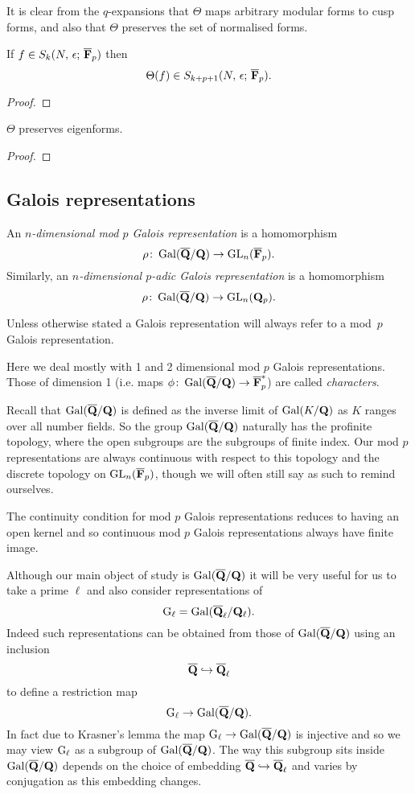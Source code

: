 \documentclass[a4paper,12pt]{article}
\begin{document}
It is clear from the $q$-expansions that $\Theta$ maps arbitrary modular forms to cusp forms, and also that $\Theta$ preserves the set of normalised forms.

\begin{prop}
If $f\in S_k(N,\,\epsilon;\,\overline{\mathbf{F}}_p)$ then
\[
\Theta(f)\in S_{k+p+1}(N,\,\epsilon;\,\overline{\mathbf{F}}_p).
\]
\end{prop}
\begin{proof}
\end{proof}

\begin{prop}
$\Theta$ preserves eigenforms.
\end{prop}
\begin{proof}
\end{proof}


\subsection{Galois representations}\label{sec:gals}
\begin{defn}
An \emph{$n$-dimensional mod $p$ Galois representation} is a homomorphism
\[
\rho\colon \operatorname{Gal}(\overline{\mathbf{Q}}/\mathbf{Q}) \to \operatorname{GL}_n(\overline{\mathbf{F}}_p).
\]
Similarly, an \emph{$n$-dimensional $p$-adic Galois representation} is a homomorphism
\[
\rho\colon \operatorname{Gal}(\overline{\mathbf{Q}}/\mathbf{Q}) \to \operatorname{GL}_n(\mathbf{Q}_p).
\]

Unless otherwise stated a Galois representation will always refer to a mod~$p$ Galois representation.
\end{defn}

Here we deal mostly with 1 and 2 dimensional mod $p$ Galois representations.
Those of dimension 1 (i.e. maps $\phi\colon\operatorname{Gal}(\overline{\mathbf{Q}}/\mathbf{Q}) \to \overline{\mathbf{F}}_p^*$) are called \emph{characters}.

Recall that $\operatorname{Gal}(\overline{\mathbf{Q}}/\mathbf{Q})$ is defined as the inverse limit of $\operatorname{Gal}(K/\mathbf{Q})$ as $K$ ranges over all number fields.
So the group $\operatorname{Gal}(\overline{\mathbf{Q}}/\mathbf{Q})$ naturally has the profinite topology, where the open subgroups are the subgroups of finite index.
Our mod $p$ representations are always continuous with respect to this topology and the discrete topology on $\operatorname{GL}_n(\overline{\mathbf{F}}_p)$, though we will often still say as such to remind ourselves.

\begin{rmk}\label{rmk:ctsfin}
The continuity condition for mod $p$ Galois representations reduces to having an open kernel and so continuous mod $p$ Galois representations always have finite image.
\end{rmk}

Although our main object of study is $\operatorname{Gal}(\overline{\mathbf{Q}}/\mathbf{Q})$ it will be very useful for us to take a prime $\ell$ and also consider representations of
\[
\mathrm{G}_\ell = \operatorname{Gal}(\overline{\mathbf{Q}}_\ell/\mathbf{Q}_\ell).
\]
Indeed such representations can be obtained from those of $\operatorname{Gal}(\overline{\mathbf{Q}}/\mathbf{Q})$ using an inclusion
\[
\overline{\mathbf{Q}} \hookrightarrow \overline{\mathbf{Q}}_\ell
\]
to define a restriction map
\[
\mathrm{G}_\ell \to \operatorname{Gal}(\overline{\mathbf{Q}}/\mathbf{Q}).
\]
In fact due to Krasner's lemma \cite[p. 238]{Cohen} the map $\mathrm{G}_\ell \to \operatorname{Gal}(\overline{\mathbf{Q}}/\mathbf{Q})$ is injective and so we may view $\mathrm{G}_\ell$ as a subgroup of $\operatorname{Gal}(\overline{\mathbf{Q}}/\mathbf{Q})$.
The way this subgroup sits inside $\operatorname{Gal}(\overline{\mathbf{Q}}/\mathbf{Q})$ depends on the choice of embedding $\overline{\mathbf{Q}} \hookrightarrow \overline{\mathbf{Q}}_\ell$ and varies by conjugation as this embedding changes.
\end{document}
